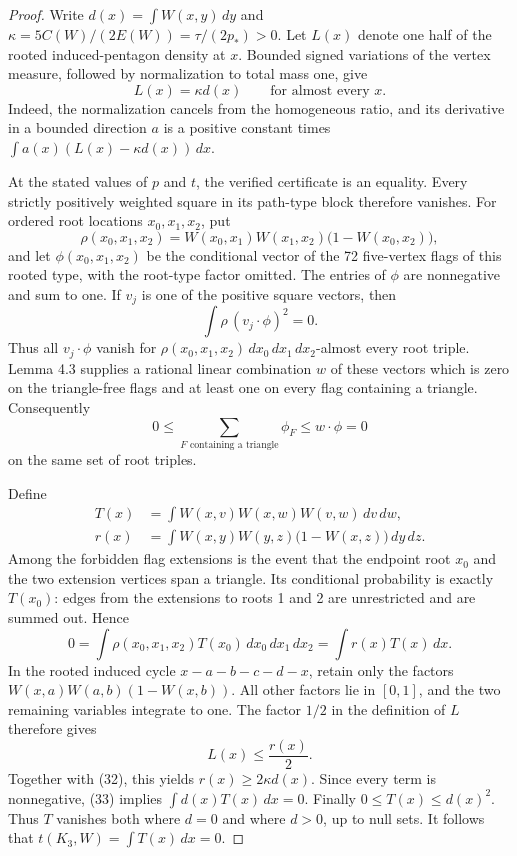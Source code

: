 \begin{proof}
Write $d(x)=\int W(x,y)\,dy$ and
$\kappa=5C(W)/(2E(W))=\tau/(2p_\ast)>0$.
Let $L(x)$ denote one half of the rooted induced-pentagon density at $x$.
Bounded signed variations of the vertex measure, followed by normalization
to total mass one, give
\begin{equation}\tag{32}\label{eq:32}
 L(x)=\kappa d(x)\qquad\text{for almost every }x.
\end{equation}
Indeed, the normalization cancels from the homogeneous ratio, and its
derivative in a bounded direction $a$ is a positive constant times
$\int a(x)(L(x)-\kappa d(x))\,dx$.

At the stated values of $p$ and $t$, the verified certificate is an equality.
Every strictly positively weighted square in its path-type block therefore
vanishes. For ordered root locations $x_0,x_1,x_2$, put
\[
 \rho(x_0,x_1,x_2)=W(x_0,x_1)W(x_1,x_2)\bigl(1-W(x_0,x_2)\bigr),
\]
and let $\phi(x_0,x_1,x_2)$ be the conditional vector of the 72 five-vertex
flags of this rooted type, with the root-type factor omitted. The entries of
$\phi$ are nonnegative and sum to one. If $v_j$ is one of the positive square
vectors, then
\[
 \int\rho\,(v_j\cdot\phi)^2=0.
\]
Thus all $v_j\cdot\phi$ vanish for
$\rho(x_0,x_1,x_2)\,dx_0\,dx_1\,dx_2$-almost every root triple.
Lemma 4.3 supplies a rational linear combination $w$ of these vectors which
is zero on the triangle-free flags and at least one on every flag containing
a triangle. Consequently
\[
 0\leq\sum_{F\text{ containing a triangle}}\phi_F\leq w\cdot\phi=0
\]
on the same set of root triples.

Define
\[
 \begin{split}
 T(x)&=\int W(x,v)W(x,w)W(v,w)\,dv\,dw,\\
 r(x)&=\int W(x,y)W(y,z)\bigl(1-W(x,z)\bigr)\,dy\,dz.
 \end{split}
\]
Among the forbidden flag extensions is the event that the endpoint root
$x_0$ and the two extension vertices span a triangle. Its conditional
probability is exactly $T(x_0)$: edges from the extensions to roots 1 and 2
are unrestricted and are summed out. Hence
\begin{equation}\tag{33}\label{eq:33}
 0=\int\rho(x_0,x_1,x_2)T(x_0)\,dx_0\,dx_1\,dx_2
   =\int r(x)T(x)\,dx.
\end{equation}
In the rooted induced cycle $x-a-b-c-d-x$, retain only the factors
$W(x,a)W(a,b)(1-W(x,b))$. All other factors lie in $[0,1]$, and the two
remaining variables integrate to one. The factor $1/2$ in the definition of
$L$ therefore gives
\[
 L(x)\leq\frac{r(x)}2.
\]
Together with (32), this yields $r(x)\geq2\kappa d(x)$. Since every term
is nonnegative, (33) implies $\int d(x)T(x)\,dx=0$. Finally
$0\leq T(x)\leq d(x)^2$. Thus $T$ vanishes both where $d=0$ and where
$d>0$, up to null sets. It follows that $t(K_3,W)=\int T(x)\,dx=0$.
\end{proof}

